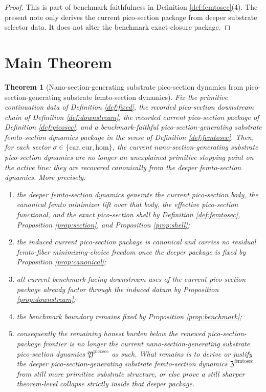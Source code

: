 \documentclass[11pt]{article}
\newcommand{\Car}{\mathrm{car}}
\newcommand{\Cur}{\mathrm{cur}}
\newcommand{\Hom}{\mathrm{hom}}
\newcommand{\PicoSectionPackage}{\mathfrak Y^{\mathrm{picosec}}}
\newcommand{\FemtoSectionPackage}{\mathfrak Z^{\mathrm{femtosec}}}
\newtheorem{theorem}{Theorem}
\begin{document}
\begin{proof}
This is part of benchmark faithfulness in Definition \ref{def:femtosec}(4). The present note only derives the current pico-section package from deeper substrate selector data. It does not alter the benchmark exact-closure package.
\end{proof}

\section{Main Theorem}

\begin{theorem}[Nano-section-generating substrate pico-section dynamics from pico-section-generating substrate femto-section dynamics]
\label{thm:main}
Fix the primitive continuation data of Definition \ref{def:fixed}, the recorded pico-section downstream chain of Definition \ref{def:downstream}, the recorded current pico-section package of Definition \ref{def:picosec}, and a benchmark-faithful pico-section-generating substrate femto-section dynamics package in the sense of Definition \ref{def:femtosec}. Then, for each sector \(\sigma\in\{\Car,\Cur,\Hom\}\), the current nano-section-generating substrate pico-section dynamics are no longer an unexplained primitive stopping point on the active line: they are recovered canonically from the deeper femto-section dynamics. More precisely:
\begin{enumerate}
    \item the deeper femto-section dynamics generate the current pico-section body, the canonical femto minimizer lift over that body, the effective pico-section functional, and the exact pico-section shell by Definition \ref{def:femtosec}, Proposition \ref{prop:section}, and Proposition \ref{prop:shell};
    \item the induced current pico-section package is canonical and carries no residual femto-fiber minimizing-choice freedom once the deeper package is fixed by Proposition \ref{prop:canonical};
    \item all current benchmark-facing downstream uses of the current pico-section package already factor through the induced datum by Proposition \ref{prop:downstream};
    \item the benchmark boundary remains fixed by Proposition \ref{prop:benchmark};
    \item consequently the remaining honest burden below the renewed pico-section-package frontier is no longer the current nano-section-generating substrate pico-section dynamics \(\PicoSectionPackage\) as such. What remains is to derive or justify the deeper pico-section-generating substrate femto-section dynamics \(\FemtoSectionPackage\) from still more primitive substrate structure, or else prove a still sharper theorem-level collapse strictly inside that deeper package.
\end{enumerate}
\end{theorem}
\end{document}
